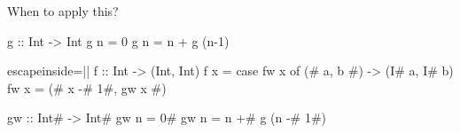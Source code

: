\documentclass{haskellbeamer}
\begin{document}
\begin{frame}[fragile]{When to apply this?}
\begin{minipage}{0.6\textwidth}
\begin{center}
\begin{overprint}
\begin{haskell}
            g  :: Int -> Int
            g  n = 0
            g  n = n + g (n-1)
          \end{haskell}
          \begin{haskell*}{escapeinside=||}
            f :: Int -> (Int, Int)
            f x = case fw x of
              (# a, b #) -> (I# a, I# b)
            fw x = (# x -# 1#, gw x #)

            gw :: Int# -> Int#
            gw n = 0#
            gw n = n +# g (n -# 1#)
          \end{haskell*}
        \end{overprint}
      \end{center}
    \end{minipage}
\end{frame}
\end{document}
